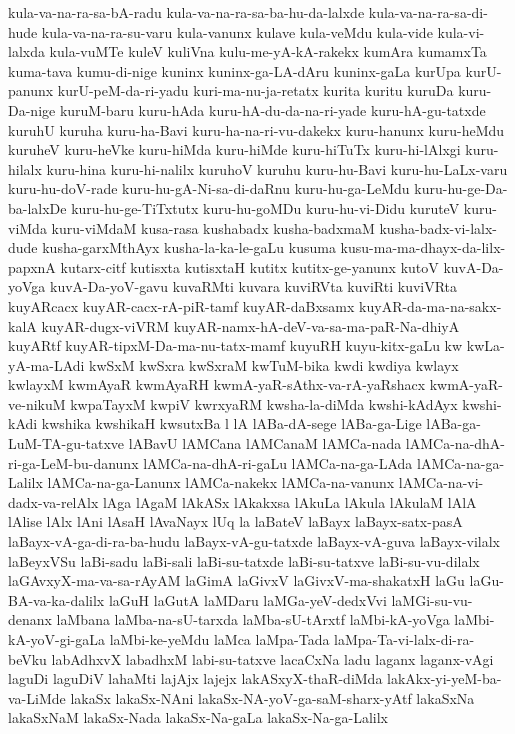 {kula-va-na-ra-sa-bA-radu
kula-va-na-ra-sa-ba-hu-da-lalxde
kula-va-na-ra-sa-di-hude
kula-va-na-ra-su-varu
kula-vanunx
kulave
kula-veMdu
kula-vide
kula-vi-lalxda
kula-vuMTe
kuleV
kuliVna
kulu-me-yA-kA-rakekx
kumAra
kumamxTa
kuma-tava
kumu-di-nige
kuninx
kuninx-ga-LA-dAru
kuninx-gaLa
kurUpa
kurU-panunx
kurU-peM-da-ri-yadu
kuri-ma-nu-ja-retatx
kurita
kuritu
kuruDa
kuru-Da-nige
kuruM-baru
kuru-hAda
kuru-hA-du-da-na-ri-yade
kuru-hA-gu-tatxde
kuruhU
kuruha
kuru-ha-Bavi
kuru-ha-na-ri-vu-dakekx
kuru-hanunx
kuru-heMdu
kuruheV
kuru-heVke
kuru-hiMda
kuru-hiMde
kuru-hiTuTx
kuru-hi-lAlxgi
kuru-hilalx
kuru-hina
kuru-hi-nalilx
kuruhoV
kuruhu
kuru-hu-Bavi
kuru-hu-LaLx-varu
kuru-hu-doV-rade
kuru-hu-gA-Ni-sa-di-daRnu
kuru-hu-ga-LeMdu
kuru-hu-ge-Da-ba-lalxDe
kuru-hu-ge-TiTxtutx
kuru-hu-goMDu
kuru-hu-vi-Didu
kuruteV
kuru-viMda
kuru-viMdaM
kusa-rasa
kushabadx
kusha-badxmaM
kusha-badx-vi-lalx-dude
kusha-garxMthAyx
kusha-la-ka-le-gaLu
kusuma
kusu-ma-ma-dhayx-da-lilx-papxnA
kutarx-citf
kutisxta
kutisxtaH
kutitx
kutitx-ge-yanunx
kutoV
kuvA-Da-yoVga
kuvA-Da-yoV-gavu
kuvaRMti
kuvara
kuviRVta
kuviRti
kuviVRta
kuyARcacx
kuyAR-cacx-rA-piR-tamf
kuyAR-daBxsamx
kuyAR-da-ma-na-sakx-kalA
kuyAR-dugx-viVRM
kuyAR-namx-hA-deV-va-sa-ma-paR-Na-dhiyA
kuyARtf
kuyAR-tipxM-Da-ma-nu-tatx-mamf
kuyuRH
kuyu-kitx-gaLu
kw
kwLa-yA-ma-LAdi
kwSxM
kwSxra
kwSxraM
kwTuM-bika
kwdi
kwdiya
kwlayx
kwlayxM
kwmAyaR
kwmAyaRH
kwmA-yaR-sAthx-va-rA-yaRshacx
kwmA-yaR-ve-nikuM
kwpaTayxM
kwpiV
kwrxyaRM
kwsha-la-diMda
kwshi-kAdAyx
kwshi-kAdi
kwshika
kwshikaH
kwsutxBa
l
lA
lABa-dA-sege
lABa-ga-Lige
lABa-ga-LuM-TA-gu-tatxve
lABavU
lAMCana
lAMCanaM
lAMCa-nada
lAMCa-na-dhA-ri-ga-LeM-bu-danunx
lAMCa-na-dhA-ri-gaLu
lAMCa-na-ga-LAda
lAMCa-na-ga-Lalilx
lAMCa-na-ga-Lanunx
lAMCa-nakekx
lAMCa-na-vanunx
lAMCa-na-vi-dadx-va-relAlx
lAga
lAgaM
lAkASx
lAkakxsa
lAkuLa
lAkula
lAkulaM
lAlA
lAlise
lAlx
lAni
lAsaH
lAvaNayx
lUq
la
laBateV
laBayx
laBayx-satx-pasA
laBayx-vA-ga-di-ra-ba-hudu
laBayx-vA-gu-tatxde
laBayx-vA-guva
laBayx-vilalx
laBeyxVSu
laBi-sadu
laBi-sali
laBi-su-tatxde
laBi-su-tatxve
laBi-su-vu-dilalx
laGAvxyX-ma-va-sa-rAyAM
laGimA
laGivxV
laGivxV-ma-shakatxH
laGu
laGu-BA-va-ka-dalilx
laGuH
laGutA
laMDaru
laMGa-yeV-dedxVvi
laMGi-su-vu-denanx
laMbana
laMba-na-sU-tarxda
laMba-sU-tArxtf
laMbi-kA-yoVga
laMbi-kA-yoV-gi-gaLa
laMbi-ke-yeMdu
laMca
laMpa-Tada
laMpa-Ta-vi-lalx-di-ra-beVku
labAdhxvX
labadhxM
labi-su-tatxve
lacaCxNa
ladu
laganx
laganx-vAgi
laguDi
laguDiV
lahaMti
lajAjx
lajejx
lakASxyX-thaR-diMda
lakAkx-yi-yeM-ba-va-LiMde
lakaSx
lakaSx-NAni
lakaSx-NA-yoV-ga-saM-sharx-yAtf
lakaSxNa
lakaSxNaM
lakaSx-Nada
lakaSx-Na-gaLa
lakaSx-Na-ga-Lalilx
}
